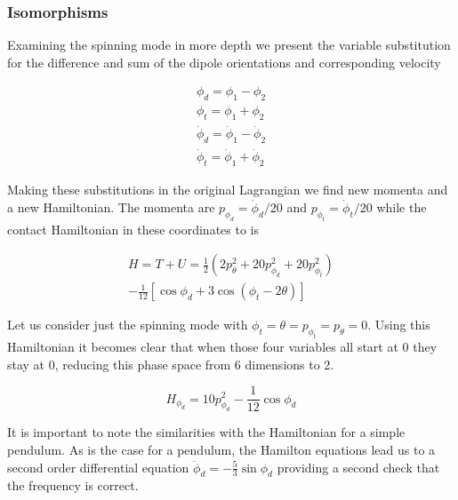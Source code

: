 \documentclass[prbg,preprint]{revtex4-1}
\begin{document}
\subsubsection{Isomorphisms} Examining the spinning mode in more depth we present the variable substitution for the difference and sum of the dipole orientations and corresponding velocity

\begin{subequations}
	\begin{gather}
		\phi_d = \phi_1-\phi_2 \\
		\phi_t = \phi_1+\phi_2 \\
		\dot\phi_d = \dot\phi_1-\dot\phi_2 \\
		\dot\phi_t = \dot\phi_1+\dot\phi_2 
	\end{gather}
\end{subequations}

Making these substitutions in the original Lagrangian we find new momenta and a new Hamiltonian.
The momenta are $p_{\phi_d}=\dot\phi_d/20$ and $p_{\phi_t}=\dot\phi_t/20$ while the contact Hamiltonian in these coordinates to is

\begin{equation}
  \begin{multlined}
	H=T+U=
	\frac{1}{2}\left (
	2 p_\theta^2
	+20 p_{\phi_d}^2 
	+20 p_{\phi_t}^2      
        \right )
        \\
	-
	\frac{1}{12}
	[
	        \cos \phi_d
	        +3\cos(\phi_t-2\theta)
	    ]
  \end{multlined}
\end{equation}

Let us consider just the spinning mode with $\phi_t=\theta=p_{\phi_t}=p_\theta=0$. Using this Hamiltonian it becomes clear that when those four variables all start at 0 they stay at 0, reducing this phase space from 6 dimensions to 2.

\begin{equation}
	H_{\phi_d}=
	10 p_{\phi_d}^2 
	-
	\frac{1}{12}
        \cos \phi_d
\end{equation}

It is important to note the similarities with the Hamiltonian for a simple pendulum. As is the case for a pendulum, the Hamilton equations lead us to  a second order differential equation $\ddot \phi_d = - \frac{5}{3}\sin \phi_d$ providing a second check that the frequency is correct.
\end{document}
